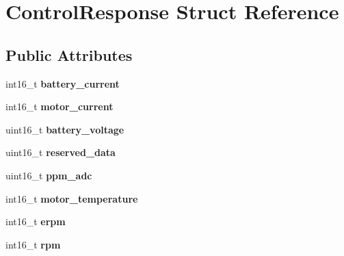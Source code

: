 \hypertarget{structControlResponse}{}\section{Control\+Response Struct Reference}
\label{structControlResponse}
\subsection*{Public Attributes}
\begin{DoxyCompactItemize}
\item 
int16\+\_\+t {\bfseries battery\+\_\+current}\hypertarget{structControlResponse_a186d016869eb2ce90a2436cfb4d04e8c}{}\label{structControlResponse_a186d016869eb2ce90a2436cfb4d04e8c}

\item 
int16\+\_\+t {\bfseries motor\+\_\+current}\hypertarget{structControlResponse_afa59d2c9e3d8dda3ebdcd7c5e17fa5f2}{}\label{structControlResponse_afa59d2c9e3d8dda3ebdcd7c5e17fa5f2}

\item 
uint16\+\_\+t {\bfseries battery\+\_\+voltage}\hypertarget{structControlResponse_a3d47770ef278ec131d29a7409b46a4e2}{}\label{structControlResponse_a3d47770ef278ec131d29a7409b46a4e2}

\item 
uint16\+\_\+t {\bfseries reserved\+\_\+data}\hypertarget{structControlResponse_af6848f07b4e4ae2e6cd49d90983b229a}{}\label{structControlResponse_af6848f07b4e4ae2e6cd49d90983b229a}

\item 
uint16\+\_\+t {\bfseries ppm\+\_\+adc}\hypertarget{structControlResponse_aebf2539ed484813d25e925a198c7849a}{}\label{structControlResponse_aebf2539ed484813d25e925a198c7849a}

\item 
int16\+\_\+t {\bfseries motor\+\_\+temperature}\hypertarget{structControlResponse_a137abb16394ba1cda8bf7de163776311}{}\label{structControlResponse_a137abb16394ba1cda8bf7de163776311}

\item 
int16\+\_\+t {\bfseries erpm}\hypertarget{structControlResponse_a20ee2b4e5fd6a8328ce713c6d9b681e0}{}\label{structControlResponse_a20ee2b4e5fd6a8328ce713c6d9b681e0}

\item 
int16\+\_\+t {\bfseries rpm}\hypertarget{structControlResponse_a6245c488d394e709d19e6d69fc9aece6}{}\label{structControlResponse_a6245c488d394e709d19e6d69fc9aece6}


\end{DoxyCompactItemize}
